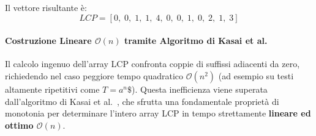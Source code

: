 \begin{table}[H]
\centering
{}
\caption{Calcolo passo-passo dell'array LCP per il testo $T\$ = \text{mississippi}\$$.}
\label{tab:calcolo-lcp-mississippi}
\end{table}

Il vettore risultante \`e:
\begin{equation}
  LCP = [0, \; 0, \; 1, \; 1, \; 4, \; 0, \; 0, \; 1, \; 0, \; 2, \; 1, \; 3]
\end{equation}

\paragraph{Costruzione Lineare $\mathcal{O}(n)$ tramite Algoritmo di Kasai et al.}
Il calcolo ingenuo dell'array LCP confronta coppie di suffissi adiacenti da zero, richiedendo nel caso peggiore tempo quadratico $\mathcal{O}(n^2)$ (ad esempio su testi altamente ripetitivi come $T = a^n\$$). Questa inefficienza viene superata dall'algoritmo di Kasai et al.~\cite{kasai2001}, che sfrutta una fondamentale propriet\`a di monotonia per determinare l'intero array LCP in tempo strettamente \textbf{lineare ed ottimo $\mathcal{O}(n)$}.

